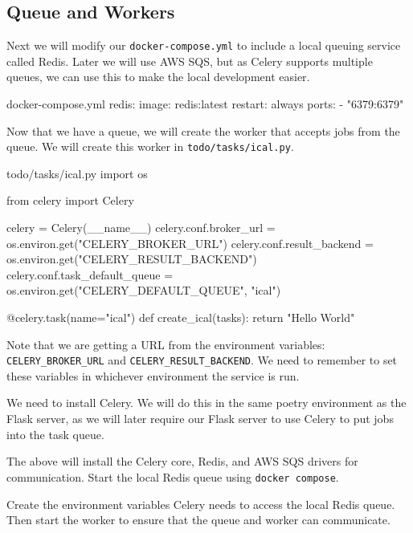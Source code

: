 \documentclass{csse4400}
\begin{document}
\subsection{Queue and Workers}

Next we will modify our \texttt{docker-compose.yml} to include a local queuing service called Redis.
Later we will use AWS SQS, but as Celery supports multiple queues,
we can use this to make the local development easier.

\vspace{-1em}
\begin{code}[numbers=none]{docker-compose.yml}
  redis:
    image: redis:latest
    restart: always
    ports:
      - "6379:6379"
\end{code}

\noindent
Now that we have a queue,
we will create the worker that accepts jobs from the queue.
We will create this worker in \texttt{todo/tasks/ical.py}.

\begin{code}[language=python,numbers=none]{todo/tasks/ical.py}
import os

from celery import Celery

celery = Celery(__name__)
celery.conf.broker_url = os.environ.get("CELERY_BROKER_URL")
celery.conf.result_backend = os.environ.get("CELERY_RESULT_BACKEND")
celery.conf.task_default_queue = os.environ.get("CELERY_DEFAULT_QUEUE", "ical")

@celery.task(name="ical")
def create_ical(tasks):
    return "Hello World"
\end{code}

\noindent
Note that we are getting a URL from the environment variables:
\texttt{CELERY\_BROKER\_URL} and \texttt{CELERY\_RESULT\_BACKEND}.
We need to remember to set these variables in whichever environment the service is run.

We need to install Celery.
We will do this in the same poetry environment as the Flask server,
as we will later require our Flask server to use Celery to put jobs into the task queue.


\noindent
The above will install the Celery core, Redis, and AWS SQS drivers for communication.
Start the local Redis queue using \texttt{docker compose}.


\noindent
Create the environment variables Celery needs to access the local Redis queue.
Then start the worker to ensure that the queue and worker can communicate.
\end{document}
